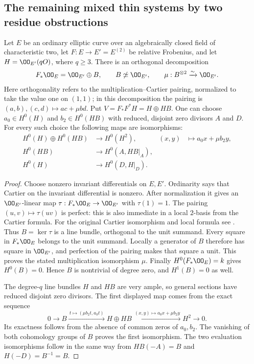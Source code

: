 \subsection{The remaining mixed thin systems by two residue obstructions}
\label{sec:DE-A3-mixed-thin-residues}

\begin{lemma}
\label{lem:DE-A3-ordinary-two-pencils}
Let $E$ be an ordinary elliptic curve over an algebraically closed
field of characteristic two, let $F:E\to E'=E^{(2)}$ be relative
Frobenius, and let $H=\OO_{E'}(qO)$, where $q\ge3$.
There is an orthogonal decomposition
\[
 F_*\OO_E=\OO_{E'}\oplus B,\qquad
 B\not\simeq\OO_{E'},\qquad
 \mu:B^{\otimes2}\xrightarrow{\sim}\OO_{E'}.
\]
Here orthogonality refers to the multiplication--Cartier pairing,
normalized to take the value one on $(1,1)$; in this decomposition
the pairing is $(a,b),(c,d)\mapsto ac+\mu bd$.
Put $V=F_*F^*H=H\oplus HB$.
One can choose $a_0\in H^0(H)$ and $b_2\in H^0(HB)$ with
reduced, disjoint zero divisors $A$ and $D$.
For every such choice the following maps are isomorphisms:
\[
\begin{split}
 H^0(H)\oplus H^0(HB)&\longrightarrow H^0(H^2),
 & (x,y)&\longmapsto a_0x+\mu b_2y,\\
 H^0(HB)&\longrightarrow H^0(A,HB|_A),\\
 H^0(H)&\longrightarrow H^0(D,H|_D).
\end{split}
\]
\end{lemma}
\begin{proof}
Choose nonzero invariant differentials on $E,E'$.
Ordinarity says that Cartier on the invariant differential is nonzero.
After normalization it gives an $\OO_{E'}$-linear map
$\tau:F_*\OO_E\to\OO_{E'}$ with $\tau(1)=1$.
The pairing $(u,v)\mapsto\tau(uv)$ is perfect: this is also immediate
in a local $2$-basis from the Cartier formula.
For the original Cartier isomorphism and local formula see
\cite[0, Theorem~2.1.9, p.~515]{Illusie1979DRW}.
Thus $B=\ker\tau$ is a line bundle, orthogonal to the unit summand.
Every square in $F_*\OO_E$ belongs to the unit summand.
Locally a generator of $B$ therefore has square in $\OO_{E'}$,
and perfection of the pairing makes that square a unit.
This proves the stated multiplication isomorphism $\mu$.
Finally $H^0(F_*\OO_E)=k$ gives $H^0(B)=0$.
Hence $B$ is nontrivial of degree zero, and $H^1(B)=0$ as well.

The degree-$q$ line bundles $H$ and $HB$ are very ample, so general
sections have reduced disjoint zero divisors.
The first displayed map comes from the exact sequence
\[
 0\longrightarrow B
 \xrightarrow{\,t\mapsto(\mu b_2t,a_0t)\,}
 H\oplus HB
 \xrightarrow{\,(x,y)\mapsto a_0x+\mu b_2y\,}
 H^2\longrightarrow0.
\]
Its exactness follows from the absence of common zeros of $a_0,b_2$.
The vanishing of both cohomology groups of $B$ proves the first
isomorphism.  The two evaluation isomorphisms follow in the same way
from $HB(-A)=B$ and $H(-D)=B^{-1}=B$.
\end{proof}

